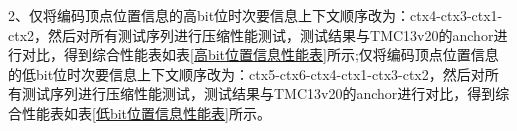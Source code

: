 \documentclass[bachelor,print,msfonts]{xduthesis}
\begin{document}
{
\scriptsize
\begin{table}[h]
    \fontsize{10.5pt}{15pt}\selectfont
    \centering
    \caption{\label{高bit位置信息性能表} 仅修改高bit位置信息上下文的性能表}
\end{table}
}

2、仅将编码顶点位置信息的高bit位时次要信息上下文顺序改为：ctx4-ctx3-ctx1-ctx2，然后对所有测试序列进行压缩性能测试，测试结果与TMC13v20的anchor进行对比，得到综合性能表如表\ref{高bit位置信息性能表}所示;仅将编码顶点位置信息的低bit位时次要信息上下文顺序改为：ctx5-ctx6-ctx4-ctx1-ctx3-ctx2，然后对所有测试序列进行压缩性能测试，测试结果与TMC13v20的anchor进行对比，得到综合性能表如表\ref{低bit位置信息性能表}所示。
\end{document}
